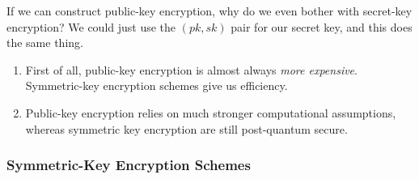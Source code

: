 \begin{ques*}
    If we can construct public-key encryption, why do we even bother with secret-key encryption? We could just use the $(pk, sk)$ pair for our secret key, and this does the same thing.
\end{ques*}

\begin{enumerate}
    \item First of all, public-key encryption is almost always \emph{more expensive}. Symmetric-key encryption schemes give us efficiency.
    \item Public-key encryption relies on much stronger computational assumptions, whereas symmetric key encryption are still post-quantum secure.
\end{enumerate}

\subsubsection{Symmetric-Key Encryption Schemes}
